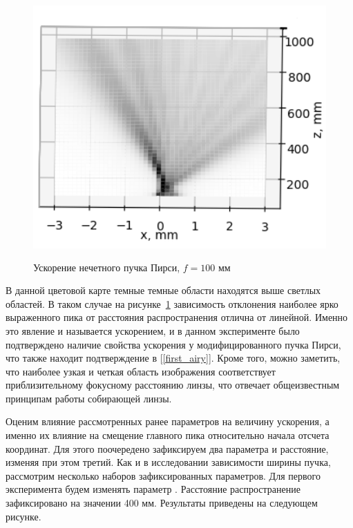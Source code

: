 {    \begin{figure}[H]
        \centering
        \includegraphics[height = 10cm]{plots/pe_acc_before_focus.png}
        \caption{Ускорение нечетного пучка Пирси, $f = 100$ мм}
        \label{correct_acc_peodd}
    \end{figure}
    \vspace{0.4cm}
    В данной цветовой карте темные темные области находятся выше светлых областей.
    В таком случае на рисунке~\ref{correct_acc_peodd} зависимость отклонения наиболее ярко
    выраженного пика от расстояния распространения отлична от линейной.
    Именно это явление и называется ускорением, и в данном эксперименте было подтверждено наличие свойства ускорения
    у модифицированного пучка Пирси, что также находит подтверждение в [\ref{first_airy}].
    Кроме того, можно заметить, что наиболее узкая и четкая область изображения соответствует приблизительному
    фокусному расстоянию линзы, что отвечает общеизвестным принципам работы собирающей линзы.

    Оценим влияние рассмотренных ранее параметров на величину ускорения, а именно их влияние на смещение главного пика относительно начала отсчета координат.
    Для этого поочередено зафиксируем два параметра и расстояние, изменяя
    при этом третий. Как и в исследовании зависимости ширины пучка, рассмотрим несколько наборов зафиксированных параметров. Для первого эксперимента будем изменять параметр \alpha.
    Расстояние распространение зафиксировано на значении 400 мм. Результаты приведены на следующем рисунке.\\

}
